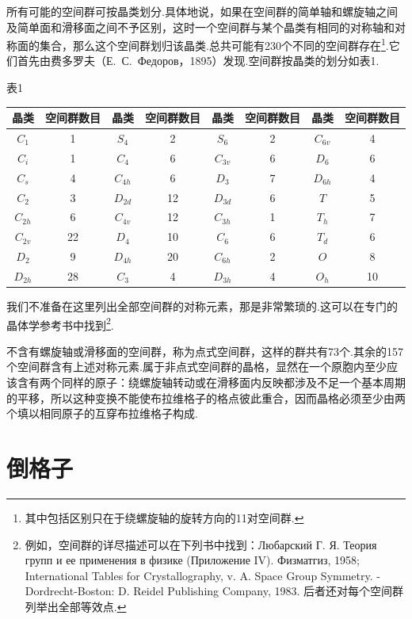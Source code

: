 所有可能的空间群可按晶类划分.具体地说，如果在空间群的简单轴和螺旋轴之间及简单面和滑移面之间不予区别，这时一个空间群与某个晶类有相同的对称轴和对称面的集合，那么这个空间群划归该晶类.总共可能有230个不同的空间群存在\footnote{其中包括区别只在于绕螺旋轴的旋转方向的11对空间群.}.它们首先由费多罗夫（Е.~С.~Федоров，1895）发现.空间群按晶类的划分如表1.

\begin{center}
表1\\[0.8em]
\small\setlength{\tabcolsep}{3.5pt}
\begin{tabular}{cccccccc}
\hline
晶类 & 空间群数目 & 晶类 & 空间群数目 & 晶类 & 空间群数目 & 晶类 & 空间群数目 \\
\hline
$C_1$ & 1 & $S_4$ & 2 & $S_6$ & 2 & $C_{6v}$ & 4 \\
$C_i$ & 1 & $C_4$ & 6 & $C_{3v}$ & 6 & $D_6$ & 6 \\
$C_s$ & 4 & $C_{4h}$ & 6 & $D_3$ & 7 & $D_{6h}$ & 4 \\
$C_2$ & 3 & $D_{2d}$ & 12 & $D_{3d}$ & 6 & $T$ & 5 \\
$C_{2h}$ & 6 & $C_{4v}$ & 12 & $C_{3h}$ & 1 & $T_h$ & 7 \\
$C_{2v}$ & 22 & $D_4$ & 10 & $C_6$ & 6 & $T_d$ & 6 \\
$D_2$ & 9 & $D_{4h}$ & 20 & $C_{6h}$ & 2 & $O$ & 8 \\
$D_{2h}$ & 28 & $C_3$ & 4 & $D_{3h}$ & 4 & $O_h$ & 10 \\
\hline
\end{tabular}
\end{center}

我们不准备在这里列出全部空间群的对称元素，那是非常繁琐的.这可以在专门的晶体学参考书中找到\footnote{例如，空间群的详尽描述可以在下列书中找到：Любарский Г. Я. Теория групп и ее применения в физике (Приложение IV). Физматгиз, 1958; International Tables for Crystallography, v. A. Space Group Symmetry. -Dordrecht-Boston: D. Reidel Publishing Company, 1983. 后者还对每个空间群列举出全部等效点.}.

不含有螺旋轴或滑移面的空间群，称为点式空间群，这样的群共有73个.其余的157个空间群含有上述对称元素.属于非点式空间群的晶格，显然在一个原胞内至少应该含有两个同样的原子：绕螺旋轴转动或在滑移面内反映都涉及不足一个基本周期的平移，所以这种变换不能使布拉维格子的格点彼此重合，因而晶格必须至少由两个填以相同原子的互穿布拉维格子构成.

\section{倒格子}

